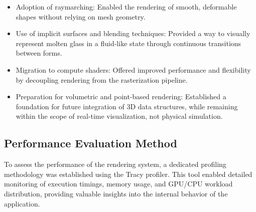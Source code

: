 \documentclass{rapportcs}
\begin{document}
        \begin{itemize}
            \item Adoption of raymarching: Enabled the rendering of smooth, deformable shapes without relying on mesh geometry.\\
            
            \item Use of implicit surfaces and blending techniques: Provided a way to visually represent molten glass in a fluid-like state through continuous transitions between forms.\\
            
            \item Migration to compute shaders: Offered improved performance and flexibility by decoupling rendering from the rasterization pipeline.\\
            
            \item Preparation for volumetric and point-based rendering: Established a foundation for future integration of 3D data structures, while remaining within the scope of real-time visualization, not physical simulation.\\
            
        \end{itemize}
    
\newpage

    
    \subsection{Performance Evaluation Method}
        To assess the performance of the rendering system, a dedicated profiling methodology was established using the Tracy profiler. This tool enabled detailed monitoring of execution timings, memory usage, and GPU/CPU workload distribution, providing valuable insights into the internal behavior of the application.\\
\end{document}
